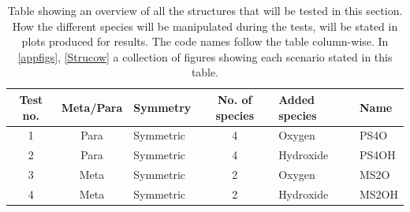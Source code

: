 \begin{table}[ht]
	\begin{tabular}{cclcll}
		\toprule
		Test no. & Meta/Para & Symmetry  & No. of species & Added species & Name  \\ \midrule
		1        & Para      & Symmetric & 4              & Oxygen        & PS4O  \\
		2        & Para      & Symmetric & 4              & Hydroxide     & PS4OH \\
		3        & Meta      & Symmetric & 2              & Oxygen        & MS2O  \\
		4        & Meta      & Symmetric & 2              & Hydroxide     & MS2OH \\
		\bottomrule
	\end{tabular}
	\caption{Table showing an overview of all the structures that will be tested in this section.  How the different species will be manipulated during the tests, will be stated in plots produced for results. The code names follow the table column-wise. In \cref{appfigs}, \cref{Strucow} a collection of figures showing each scenario stated in this table.}
	\label{testtable}
\end{table}
